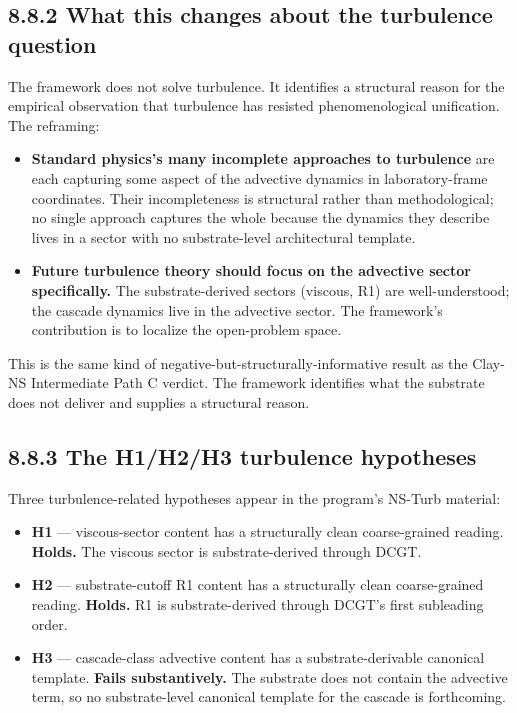 \documentclass[11pt]{book}
\begin{document}
\subsection{8.8.2 What this changes about the turbulence question}

The framework does not solve turbulence. It identifies a structural reason for the empirical observation that turbulence has resisted phenomenological unification. The reframing:

\begin{itemize}
\item \textbf{Standard physics's many incomplete approaches to turbulence} are each capturing some aspect of the advective dynamics in laboratory-frame coordinates. Their incompleteness is structural rather than methodological; no single approach captures the whole because the dynamics they describe lives in a sector with no substrate-level architectural template.
\item \textbf{Future turbulence theory should focus on the advective sector specifically.} The substrate-derived sectors (viscous, R1) are well-understood; the cascade dynamics live in the advective sector. The framework's contribution is to localize the open-problem space.
\end{itemize}

This is the same kind of negative-but-structurally-informative result as the Clay-NS Intermediate Path C verdict. The framework identifies what the substrate does not deliver and supplies a structural reason.

\subsection{8.8.3 The H1/H2/H3 turbulence hypotheses}

Three turbulence-related hypotheses appear in the program's NS-Turb material:

\begin{itemize}
\item \textbf{H1} — viscous-sector content has a structurally clean coarse-grained reading. \textbf{Holds.} The viscous sector is substrate-derived through DCGT.
\item \textbf{H2} — substrate-cutoff R1 content has a structurally clean coarse-grained reading. \textbf{Holds.} R1 is substrate-derived through DCGT's first subleading order.
\item \textbf{H3} — cascade-class advective content has a substrate-derivable canonical template. \textbf{Fails substantively.} The substrate does not contain the advective term, so no substrate-level canonical template for the cascade is forthcoming.
\end{itemize}
\end{document}
